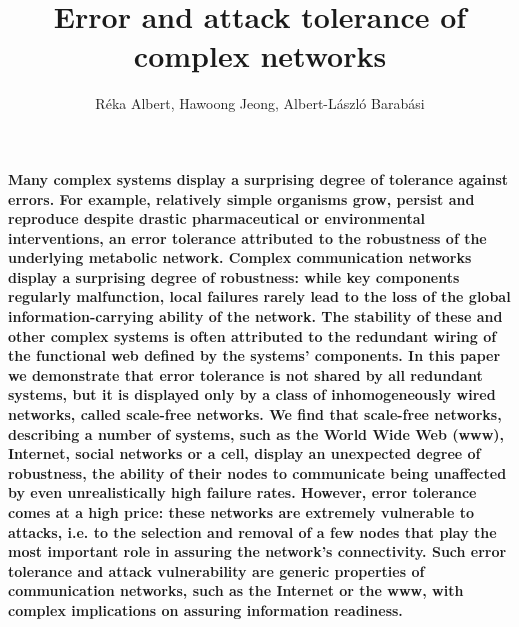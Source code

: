 

\title{Error and attack tolerance of complex networks}
\author{R\'eka Albert, Hawoong Jeong, Albert-L\'aszl\'o Barab\'asi}
\address{Department of Physics, University of Notre Dame, Notre Dame, IN 46556}
\maketitle 
 
\vspace{0.5in}

{\bf Many complex systems display a surprising degree of
 tolerance against errors. For example, relatively simple organisms grow, persist and reproduce despite drastic pharmaceutical or environmental interventions, an error tolerance attributed to the robustness of the underlying metabolic network\cite{biology}. Complex  communication networks\cite{claffy} display a surprising degree of robustness: while key components regularly malfunction, local failures rarely lead to the loss of the global information-carrying ability of the network. The stability of these and other complex systems is often attributed to the redundant wiring of the functional web defined by the systems' components. In this paper we demonstrate that error tolerance is not shared by all redundant systems, but it is displayed only by a class of inhomogeneously wired networks, called scale-free networks. We find that scale-free networks, describing  a number of systems, such as the World Wide Web (www)\cite{diam,ibm,hubermann}, Internet\cite{faloutsos}, social networks\cite{social} or a cell\cite{jeong}, display an unexpected degree of robustness, the ability of their nodes to communicate being unaffected by even unrealistically high failure rates. However, error tolerance comes at a high price: these networks are extremely vulnerable to attacks, i.e. to the selection and removal of a few nodes that play the most important role in assuring the network's connectivity. Such error tolerance and attack vulnerability are generic properties of communication networks,  such as the Internet or the www, with complex implications on assuring information readiness.}
 
\newpage

